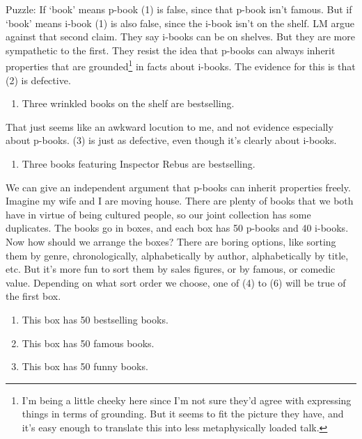 \documentclass[
  11pt,
  letterpaper,
  DIV=11,
  numbers=noendperiod,
  twoside]{scrartcl}
\providecommand{\tightlist}{%
  \setlength{\itemsep}{0pt}\setlength{\parskip}{0pt}}
\begin{document}
Puzzle: If `book' means p-book (1) is false, since that p-book isn't
famous. But if `book' means i-book (1) is also false, since the i-book
isn't on the shelf. LM argue against that second claim. They say i-books
can be on shelves. But they are more sympathetic to the first. They
resist the idea that p-books can always inherit properties that are
grounded\footnote{I'm being a little cheeky here since I'm not sure
  they'd agree with expressing things in terms of grounding. But it
  seems to fit the picture they have, and it's easy enough to translate
  this into less metaphysically loaded talk.} in facts about i-books.
The evidence for this is that (2) is defective.

\begin{enumerate}
\def\labelenumi{(\arabic{enumi})}
\setcounter{enumi}{1}
\tightlist
\item
  Three wrinkled books on the shelf are bestselling.
\end{enumerate}

That just seems like an awkward locution to me, and not evidence
especially about p-books. (3) is just as defective, even though it's
clearly about i-books.

\begin{enumerate}
\def\labelenumi{(\arabic{enumi})}
\setcounter{enumi}{2}
\tightlist
\item
  Three books featuring Inspector Rebus are bestselling.
\end{enumerate}

We can give an independent argument that p-books can inherit properties
freely. Imagine my wife and I are moving house. There are plenty of
books that we both have in virtue of being cultured people, so our joint
collection has some duplicates. The books go in boxes, and each box has
50 p-books and 40 i-books. Now how should we arrange the boxes? There
are boring options, like sorting them by genre, chronologically,
alphabetically by author, alphabetically by title, etc. But it's more
fun to sort them by sales figures, or by famous, or comedic value.
Depending on what sort order we choose, one of (4) to (6) will be true
of the first box.

\begin{enumerate}
\def\labelenumi{(\arabic{enumi})}
\setcounter{enumi}{3}
\tightlist
\item
  This box has 50 bestselling books.
\item
  This box has 50 famous books.
\item
  This box has 50 funny books.
\end{enumerate}
\end{document}
